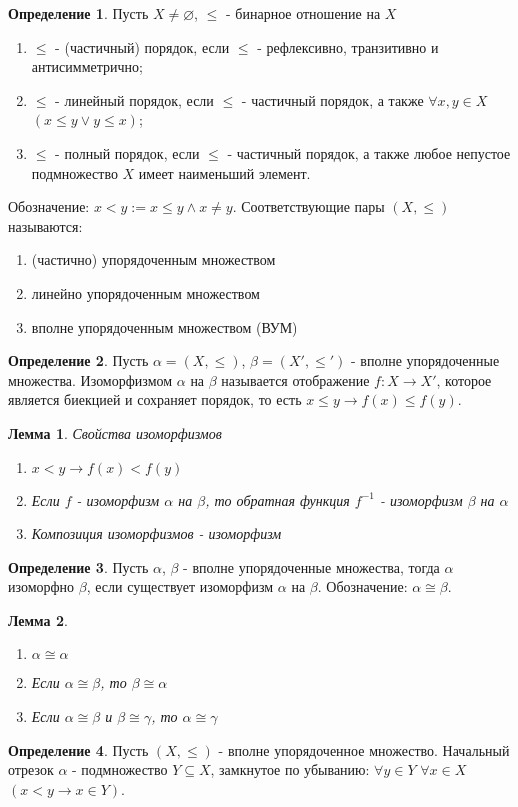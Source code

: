 \documentclass[a4paper, 12pt]{article}
\theoremstyle{definition}
\newtheorem*{definition}{Определение}
\theoremstyle{plain}
\newtheorem*{lemma}{Лемма}
\theoremstyle{remark}
\begin{document}
  \begin{definition}
    Пусть $X\not=\varnothing$, $\leqslant$ - бинарное отношение на $X$
    \begin{enumerate}
      \item $\leqslant$ - (частичный) порядок, если $\leqslant$ - рефлексивно, транзитивно и антисимметрично;
      \item $\leqslant$ - линейный порядок, если $\leqslant$ - частичный порядок, а также $\forall x, y\in X$ $(x\leqslant y\vee y\leqslant x)$;
      \item $\leqslant$ - полный порядок, если $\leqslant$ - частичный порядок, а также любое непустое подмножество $X$ имеет наименьший элемент.
    \end{enumerate}
    Обозначение: $x<y:=x\leqslant y\wedge x\neq y$.
    Соответствующие пары $(X,\leqslant)$ называются:
    \begin{enumerate}
      \item (частично) упорядоченным множеством
      \item линейно упорядоченным множеством
      \item вполне упорядоченным множеством (ВУМ)
    \end{enumerate}
  \end{definition}
  \begin{definition}
    Пусть $\alpha=(X,\leqslant)$, $\beta=(X',\leqslant')$ - вполне упорядоченные множества. Изоморфизмом $\alpha$ на $\beta$ называется отображение $f:X\to X'$, которое является биекцией и сохраняет порядок, то есть $x\leqslant y\to f(x)\leqslant f(y)$.
  \end{definition}
  \begin{lemma}{Свойства изоморфизмов}
    \begin{enumerate}
      \item $x<y\to f(x)<f(y)$
      \item Если $f$ - изоморфизм $\alpha$ на $\beta$, то обратная функция $f^{-1}$ - изоморфизм $\beta$ на $\alpha$
      \item Композиция изоморфизмов - изоморфизм
    \end{enumerate}
  \end{lemma}
  \begin{definition}
    Пусть $\alpha$, $\beta$ - вполне упорядоченные множества, тогда $\alpha$ изоморфно $\beta$, если существует изоморфизм $\alpha$ на $\beta$. Обозначение: $\alpha\cong\beta$.
  \end{definition}
  \begin{lemma}
    \begin{enumerate}
      \item $\alpha\cong\alpha$
      \item Если $\alpha\cong\beta$, то $\beta\cong\alpha$
      \item Если $\alpha\cong\beta$ и $\beta\cong\gamma$, то $\alpha\cong\gamma$
    \end{enumerate}
  \end{lemma}
  \begin{definition}
    Пусть $(X,\leqslant)$ - вполне упорядоченное множество. Начальный отрезок $\alpha$ - подмножество $Y\subseteq X$, замкнутое по убыванию: $\forall y\in Y$ $\forall x\in X$ $(x<y\to x\in Y)$.
  \end{definition}
  
\end{document}

